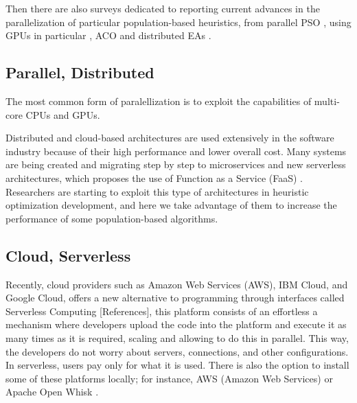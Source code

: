 \documentclass[runningheads]{llncs}
\begin{document}
Then there are also surveys dedicated to reporting current advances in the
parallelization of particular population-based heuristics, from parallel PSO
\cite{Lalwani2019}, using GPUs in particular \cite{tan2015survey} , ACO
\cite{pedemonte2011survey} and distributed EAs \cite{gong2015distributed}.  


\subsection{Parallel, Distributed}
The most common form of paralellization is to exploit the capabilities of multi-core CPUs and
GPUs.   




Distributed and cloud-based architectures are used extensively in the software
industry because of their high performance and lower overall cost. Many systems
are being created and migrating step by step to microservices and new serverless
architectures, which proposes the use of Function as a Service (FaaS) 
\cite{Hellerstein2018,Everywhere,Baird2016}. 
Researchers are starting to exploit this type of architectures in heuristic optimization
development, and here we take advantage of them to increase the performance of
some population-based algorithms.

\subsection{Cloud, Serverless}


Recently, cloud providers such as Amazon Web Services (AWS), IBM Cloud, and
Google Cloud, offers a new alternative to programming through interfaces called
Serverless Computing [References], this platform consists of an effortless a
mechanism where developers upload the code into the platform and execute it as
many times as it is required, scaling and allowing to do this in parallel. This
way, the developers do not worry about servers, connections, and other
configurations. In serverless, users pay only for what it is used. There is also
the option to install some of these platforms locally; for instance, AWS (Amazon
Web Services) \cite{Baird2016} or Apache Open Whisk \cite{Guerv2018}. 
\end{document}
